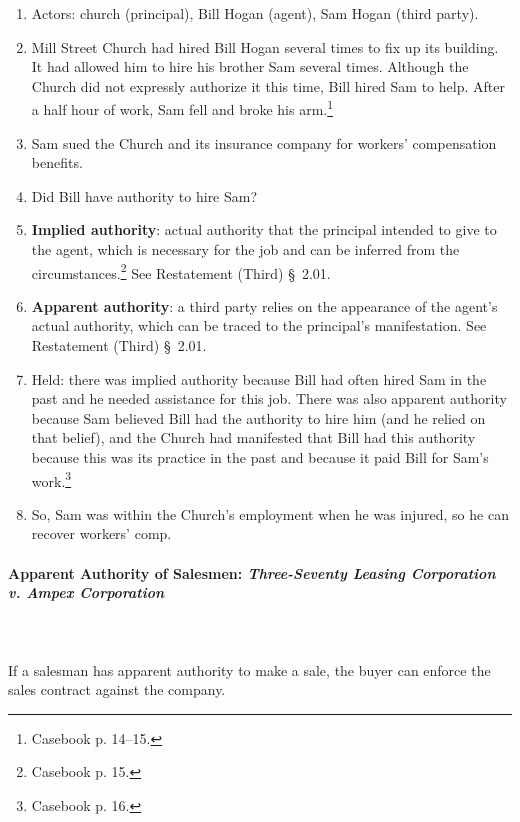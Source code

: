 \begin{enumerate}
    \item Actors: church (principal), Bill Hogan (agent), Sam Hogan (third 
    party).
    \item Mill Street Church had hired Bill Hogan several times to fix up its 
    building. It had allowed him to hire his brother Sam several times. 
    Although the Church did not expressly authorize it this time, Bill hired 
    Sam to help. After a half hour of work, Sam fell and broke his 
    arm.\footnote{Casebook p. 14--15.}
    \item Sam sued the Church and its insurance company for workers' 
    compensation benefits.
    \item Did Bill have authority to hire Sam?
    \item \textbf{Implied authority}: actual authority that the principal 
    intended to give to the agent, which is necessary for the job and can be 
    inferred from the circumstances.\footnote{Casebook p. 15.} See 
    Restatement (Third) \S\ 2.01.
    \item \textbf{Apparent authority}: a third party relies on the appearance 
    of the agent's actual authority, which can be traced to the principal's 
    manifestation. See Restatement (Third) \S\ 2.01.
    \item Held: there was implied authority because Bill had often hired Sam 
    in the past and he needed assistance for this job. There was also apparent 
    authority because Sam believed Bill had the authority to hire him (and he 
    relied on that belief), and the Church had manifested that Bill had this 
    authority because this was its practice in the past and because it paid 
    Bill for Sam's work.\footnote{Casebook p. 16.}
    \item So, Sam was within the Church's employment when he was injured, so 
    he can recover workers' comp.
\end{enumerate}

\paragraph{Apparent Authority of Salesmen: \emph{Three-Seventy Leasing 
Corporation v. Ampex Corporation}}
~\\\\
If a salesman has apparent authority to make a sale, the buyer can enforce the 
sales contract against the company.

